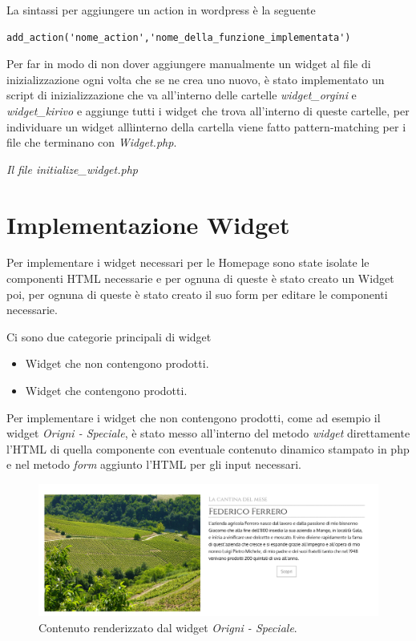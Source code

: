 La sintassi per aggiungere un action in wordpress è la seguente
\begin{verbatim}
add_action('nome_action','nome_della_funzione_implementata')
\end{verbatim}

Per far in modo di non dover aggiungere manualmente un widget al file di inizializzazione ogni volta che se ne crea uno nuovo, è
stato implementato un script di inizializzazione che va all'interno delle cartelle \emph{widget\_orgini} e \emph{widget\_kirivo} e aggiunge tutti
i widget che trova all'interno di queste cartelle, per individuare un widget allìinterno della cartella viene fatto pattern-matching per i file che terminano con \emph{Widget.php}.


\emph{Il file initialize\_widget.php}

\section{Implementazione Widget}
Per implementare i widget necessari per le Homepage sono state isolate le componenti HTML necessarie e per ognuna
di queste è stato creato un Widget poi, per ognuna di queste è stato creato il suo form per editare le componenti necessarie.

Ci sono due categorie principali di widget
\begin{itemize}
\item Widget che non contengono prodotti.
\item Widget che contengono prodotti.
\end{itemize}

Per implementare i widget che non contengono prodotti, come ad esempio il widget \emph{Origni - Speciale}, è stato messo all'interno del metodo \emph{widget} direttamente
l'HTML di quella componente con eventuale contenuto dinamico stampato in php e nel metodo \emph{form} aggiunto l'HTML per gli input necessari.

\begin{figure}
  \includegraphics[width=\textwidth]{figure/ospec.png}
  \caption{Contenuto renderizzato dal widget \emph{Origni - Speciale}.}
  \label{fig:ospec1}
\end{figure}

